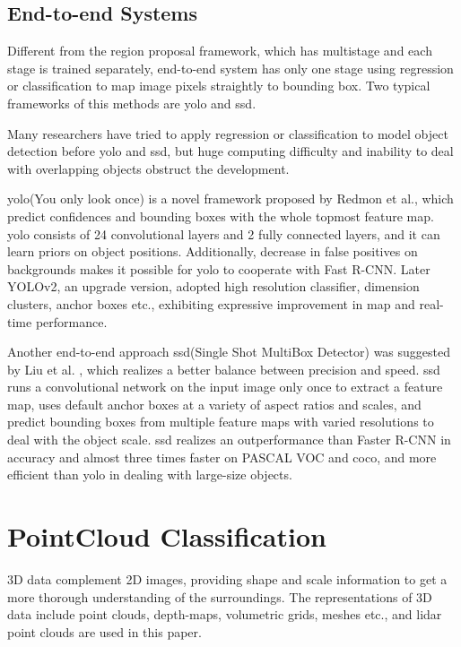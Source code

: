 \subsection{End-to-end Systems}
Different from the region proposal framework, which has multistage and each stage is trained separately, end-to-end system has only one stage using regression or classification to map image pixels straightly to bounding box. Two typical frameworks of this methods are \acrshort{yolo}\cite{redmon_you_2016} and \acrshort{ssd}\cite{liu_ssd_2016}.

Many researchers have tried to apply regression or classification to model object detection before \acrshort{yolo} and \acrshort{ssd}, but huge computing difficulty and inability to deal with overlapping objects obstruct the development. 

\acrshort{yolo}(You only look once) is a novel framework proposed by Redmon et al.\cite{redmon_you_2016}, which predict confidences and bounding boxes with the whole topmost feature map. \acrshort{yolo} consists of 24 convolutional layers and 2 fully connected layers, and it can learn priors on object positions. Additionally, decrease in false positives on backgrounds makes it possible for \acrshort{yolo} to cooperate with Fast R-CNN. Later YOLOv2, an upgrade version, adopted high resolution classifier, dimension clusters, anchor boxes etc., exhibiting expressive improvement in m\acrshort{ap} and real-time performance.\cite{redmon_yolo9000_2016}

Another end-to-end approach \acrshort{ssd}(Single Shot MultiBox Detector) was suggested by Liu et al. \cite{liu_ssd_2016}, which realizes a better balance between precision and speed. \acrshort{ssd} runs a convolutional network on the input image only once to extract a feature map, uses default anchor boxes at a variety of aspect ratios and scales, and predict bounding boxes from multiple feature maps with varied resolutions to deal with the object scale. \acrshort{ssd} realizes an outperformance than Faster R-CNN in accuracy and almost three times faster on PASCAL VOC\cite{everingham_pascal_2010} and \acrshort{coco}\cite{lin_microsoft_2015}, and more efficient than \acrshort{yolo} in dealing with large-size objects.

\section{PointCloud Classification}
3D data complement 2D images, providing shape and scale information to get a more thorough understanding of the surroundings. The representations of 3D data include point clouds, depth-maps, volumetric grids, meshes etc., and \acrshort{lidar} point clouds are used in this paper. 

